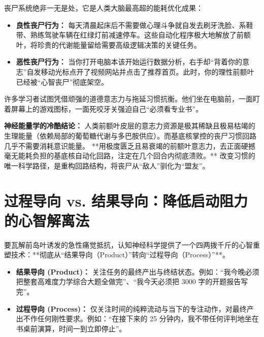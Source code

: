 \documentclass[12pt,a4paper,openany]{ctexbook}
\begin{document}
丧尸系统绝非一无是处，它是人类大脑最高超的能耗优化成果：
\begin{itemize}
    \item \textbf{良性丧尸行为：} 每天清晨起床后不需要做心理斗争就自发去刷牙洗脸、系鞋带、熟练驾驶车辆在红绿灯前减速停车。这些自动化程序极大地解放了前额叶，将珍贵的代谢能量留给需要高级逻辑决策的关键任务。
    \item \textbf{恶性丧尸行为：} 当你打开电脑本该开始运行数据分析，右手却“背着你的意志”自发移动光标点开了视频网站并点击了推荐首页。此时，你的理性前额叶已经被“心智丧尸”彻底架空。
\end{itemize}

\begin{warningbox}
许多学习者试图凭借顽强的道德意志力与拖延习惯抗衡。他们坐在电脑前，一面盯着屏幕上的游戏图标，一面死咬牙关强迫自己“必须看专业书”。

\textbf{神经能量学的冷酷结论：}
人类前额叶皮层的意志力资源是极其稀缺且极易枯竭的生理能量（依赖局部的葡萄糖代谢与多巴胺供应）。而基底核掌控的丧尸习惯回路几乎不需要消耗意识能量。
**用极度匮乏且易衰竭的前额叶意志力，去正面硬撼毫无能耗负担的基底核自动化回路，注定在几个回合内彻底溃败。** 改变习惯的唯一科学路径，是重构回路结构，将丧尸从“敌人”驯化为“盟友”。
\end{warningbox}

\section{过程导向 vs. 结果导向：降低启动阻力的心智解离法}

要瓦解前岛叶诱发的急性痛觉抵抗，认知神经科学提供了一个四两拨千斤的心智重塑技术：**彻底从“结果导向（Product）”转向“过程导向（Process）”**。

\begin{keypoint}[过程 vs. 结果的定义差异]
\begin{itemize}
    \item \textbf{结果导向 (Product)：} 关注任务的最终产出与终结状态。例如：“我今晚必须把整套高难度力学综合大题全做完”、“我今天必须把 3000 字的开题报告写完”。
    \item \textbf{过程导向 (Process)：} 仅关注时间的纯粹流动与当下的专注动作，对最终产出不作任何刚性要求。例如：“在接下来的 25 分钟内，我不带任何评判地坐在书桌前演算，时间一到立即停止”。
\end{itemize}
\end{keypoint}
\end{document}
